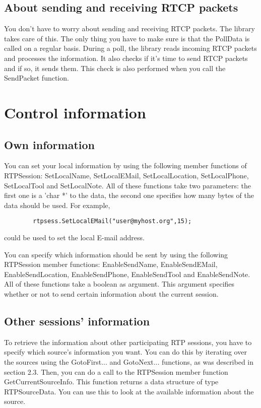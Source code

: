 \subsection{About sending and receiving RTCP packets}

You don't have to worry about sending and receiving RTCP packets. The library
takes care of this. The only thing you have to make sure is that the PollData
is called on a regular basis. During a poll, the library reads incoming RTCP
packets and processes the information. It also checks if it's time to send
RTCP packets and if so, it sends them. This check is also performed when you
call the SendPacket function.

\section{Control information}

\subsection{Own information}

You can set your local information by using the following member functions of
RTPSession: SetLocalName, SetLocalEMail, SetLocalLocation, SetLocalPhone,
SetLocalTool and SetLocalNote. All of these functions take two parameters: the
first one is a 'char *' to the data, the second one specifies how many bytes
of the data should be used. For example,
        \begin{verbatim}
        rtpsess.SetLocalEMail("user@myhost.org",15);
        \end{verbatim}
could be used to set the local E-mail address.


You can specify which information should be sent by using the following
RTPSession member functions: EnableSendName, EnableSendEMail,
EnableSendLocation, EnableSendPhone, EnableSendTool and EnableSendNote. All of
these functions take a boolean as argument. This argument specifies whether or
not to send certain information about the current session.

\subsection{Other sessions' information}

To retrieve the information about other participating RTP sessions, you have
to specify which source's information you want. You can do this by iterating
over the sources using the GotoFirst... and GotoNext... functions, as was
described in section 2.3. Then, you can do a call to the RTPSession member
function GetCurrentSourceInfo. This function returns a data structure of type
RTPSourceData. You can use this to look at the available information about
the source.
    
